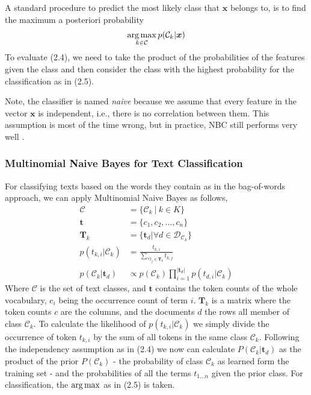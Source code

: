 A standard procedure to predict the most likely class that $\boldsymbol{x}$ belongs to, is to find the maximum a posteriori probability
\begin{gather}
  \operatorname*{arg\,max}_{k \in \mathcal{C}} p(\mathcal{C}_k|\boldsymbol{x})
\end{gather}
To evaluate (2.4), we need to take the product of the probabilities of the features given the class and then consider the class with the highest probability for the classification as in (2.5).

Note,  the classifier is named \textsl{naive} because we assume that every feature in the vector $\boldsymbol{x}$ is independent, i.e., there is no correlation between them. This assumption is most of the time wrong, but in practice, NBC still performs very well \citep{Rish2001}.


\subsubsection{Multinomial Naive Bayes for Text Classification}
For classifying texts based on the words they contain as in the bag-of-words approach, we can apply Multinomial Naive Bayes as follows,
\begin{align}
  \mathcal{C} &= \{\mathcal{C}_k \: | \: k \in K \} \\
  \boldsymbol{t} &= \{c_1, c_2, \dots, c_n\} \\
  \boldsymbol{T}_{k} &= \{\boldsymbol{t}_d | \forall d \in \mathcal{D}_{\mathcal{C}_{k}}\} \\
  p({t_{k,i}}|\mathcal{C}_k) &= \frac{t_{k, i}}{\sum_{\forall t_j \in \boldsymbol{T}_k} t_{k, j}} \\
  p(\mathcal{C}_k|\boldsymbol{t}_d) &\propto p(\mathcal{C}_k) \prod_{i=1}^{|\boldsymbol{t}_d|}  p(t_{d,i}|\mathcal{C}_k)
\end{align}
Where $\mathcal{C}$ is the set of text classes, and $\boldsymbol{t}$ contains the token counts of the whole vocabulary, $c_i$ being the occurrence count of term $i$. $\boldsymbol{T}_k$ is a matrix where the token counts $c$ are the columns, and the documents $d$ the rows all member of class $\mathcal{C}_k$. To calculate the likelihood of $p({t_{k,i}}|\mathcal{C}_k)$ we simply divide the occurrence of token $t_{k,i}$ by the sum of all tokens in the same class $\mathcal{C}_k$. Following the independency assumption as in (2.4) we now can calculate $P(\mathcal{C}_k | \boldsymbol{t}_d)$ as the product of the prior $P(\mathcal{C}_k)$ - the probability of class $\mathcal{C}_k$
as learned form the training set - and the probabilities of all the terms $t_{1 \dots n}$ given the prior class. For classification, the $\operatorname*{arg\,max}$ as in (2.5) is taken.


